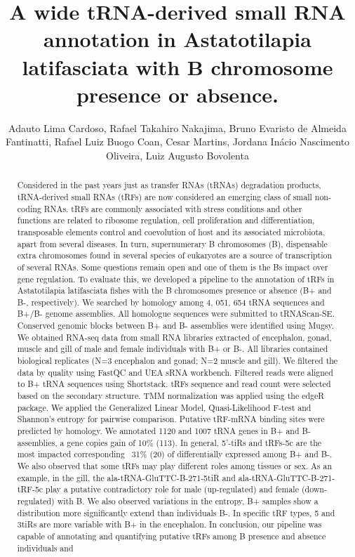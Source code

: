\documentclass[twoside]{article}
\title{\vspace{-15mm}\fontsize{24pt}{10pt}\selectfont\textbf{ A wide tRNA-derived small RNA annotation in Astatotilapia latifasciata with B chromosome presence or absence. }} %
\author{ Adauto Lima Cardoso,  Rafael Takahiro Nakajima,  Bruno Evaristo de Almeida Fantinatti,  Rafael Luiz Buogo Coan,  Cesar Martins,  Jordana In\'acio Nascimento Oliveira,  Luiz Augusto Bovolenta }
\affil{ IBB - UNESP Botucatu,  UNIVERSIDADE ESTADUAL PAULISTA J\'ULIO DE MESQUITA FILHO,  UNESP - Instituto de Bioci\^encias - Botucatu/SP,  UNESP - Universidade Estadual Paulista }
\date{}
\begin{document}
  
  
  \maketitle %
  
  
  \thispagestyle{fancy} %
  
  
  \begin{abstract}
  Considered in the past years just as transfer RNAs (tRNAs) degradation products,  tRNA-derived small RNAs (tRFs) are now considered an emerging class of small non-coding RNAs. tRFs are commonly associated with stress conditions and other functions are related to ribosome regulation,  cell proliferation and differentiation,  transposable elements control and coevolution of host and its associated microbiota,  apart from several diseases. In turn,  supernumerary B chromosomes (B),  dispensable extra chromosomes found in several species of eukaryotes are a source of transcription of several RNAs. Some questions remain open and one of them is the Bs impact over gene regulation. To evaluate this,  we developed a pipeline to the annotation of tRFs in Astatotilapia latifasciata fishes with the B chromosomes presence or absence (B+ and B-,  respectively). We searched by homology among 4, 051, 654 tRNA sequences and B+/B- genome assemblies. All homologue sequences were submitted to tRNAScan-SE. Conserved genomic blocks between B+ and B- assemblies were identified using Mugsy. We obtained RNA-seq data from small RNA libraries extracted of encephalon,  gonad,  muscle and gill of male and female individuals with B+ or B-. All libraries contained biological replicates (N=3 encephalon and gonad; N=2 muscle and gill). We filtered the data by quality using FastQC and UEA sRNA workbench. Filtered reads were aligned to B+ tRNA sequences using Shortstack. tRFs sequence and read count were selected based on the secondary structure. TMM normalization was applied using the edgeR package. We applied the Generalized Linear Model,  Quasi-Likelihood F-test and Shannon’s entropy for pairwise comparison. Putative tRF-mRNA binding sites were predicted by homology. We annotated 1120 and 1007 tRNA genes in B+ and B- assemblies,  a gene copies gain of 10\% (113). In general,  5’-tiRs and tRFs-5c are the most impacted corresponding ~31\% (20) of differentially expressed among B+ and B-. We also observed that some tRFs may play different roles among tissues or sex. As an example,  in the gill,  the ala-tRNA-GluTTC-B-271-5tiR and ala-tRNA-GluTTC-B-271-tRF-5c play a putative contradictory role for male (up-regulated) and female (down-regulated) with B. We also observed variations in the entropy,  B+ samples show a distribution more significantly extend than individuals B-. In specific tRF types,  5 and 3tiRs are more variable with B+ in the encephalon. In conclusion,  our pipeline was capable of annotating and quantifying putative tRFs among B presence and absence individuals and 
\end{abstract}
\end{document}
